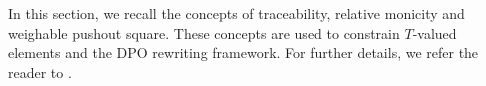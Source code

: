 In this section, we recall the concepts of traceability, relative monicity and weighable pushout square. These concepts are used to constrain \(T\)-valued elements and the DPO rewriting framework.  
For further details, we refer the reader to \cite[Section 4.1 and 4.2]{EndrullisOverbeek2024Generalized}.



